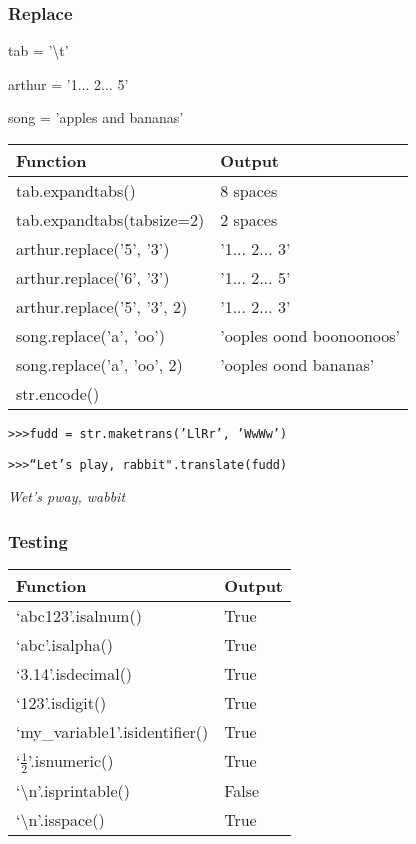 \documentclass{beamer}
\begin{document}
%
%
\begin{frame}
  \frametitle{Replace}
  tab = '\textbackslash t'

  arthur = '1... 2... 5'

  song = 'apples and bananas'
  \begin{table}
    \begin{tabular}{l | l}
    Function & Output \\
    \hline
    tab.expandtabs() & 8 spaces \\
    tab.expandtabs(tabsize=2) & 2 spaces \\
    \hline
    arthur.replace('5', '3') & '1... 2... 3'\\
    arthur.replace('6', '3') & '1... 2... 5'\\
    arthur.replace('5', '3', 2) & '1... 2... 3'\\
    song.replace('a', 'oo') & 'ooples oond boonoonoos'\\
    song.replace('a', 'oo', 2) & 'ooples oond bananas'\\
   \hline
    str.encode()
   \end{tabular}
  \end{table}

  \texttt{\textgreater \textgreater \textgreater fudd = str.maketrans('LlRr', 'WwWw')}

  \texttt{\textgreater \textgreater \textgreater ``Let's play, rabbit".translate(fudd)}

  \textit{Wet's pway, wabbit}
\end{frame}


%
%
\begin{frame}
  \frametitle{Testing}
  \begin{table}
    \begin{tabular}{l | l}
      Function & Output \\
      \hline
      `abc123'.isalnum() & True \\
      `abc'.isalpha() & True \\
      `3.14'.isdecimal() & True \\
      `123'.isdigit() & True \\
      `my\_variable1'.isidentifier() & True \\
      `$\frac{1}{2}$'.isnumeric() & True \\
      `\textbackslash n'.isprintable() & False \\
      `\textbackslash n'.isspace() & True 
    \end{tabular}
  \end{table}
\end{frame}
\end{document}
